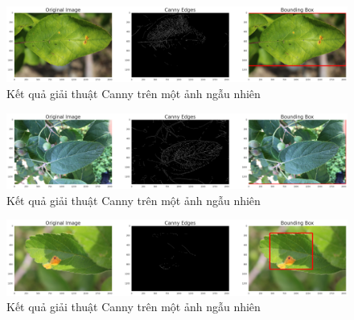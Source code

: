 \documentclass{article}
\begin{document}
	\begin{figure}[H]
		\centering
		\includegraphics[width=1\linewidth]{images/canny_edge_detector.png}
		\caption{Kết quả giải thuật Canny trên một ảnh ngẫu nhiên}
		\label{fig:writing-thesis}
	\end{figure}
	\begin{figure}[H]
		\centering
		\includegraphics[width=1\linewidth]{images/canny_edge_detector_1.png}
		\caption{Kết quả giải thuật Canny trên một ảnh ngẫu nhiên}
		\label{fig:writing-thesis}
	\end{figure}
	\begin{figure}[H]
		\centering
		\includegraphics[width=1\linewidth]{images/canny_edge_detector_2.png}
		\caption{Kết quả giải thuật Canny trên một ảnh ngẫu nhiên}
		\label{fig:writing-thesis}
	\end{figure}
\end{document}
